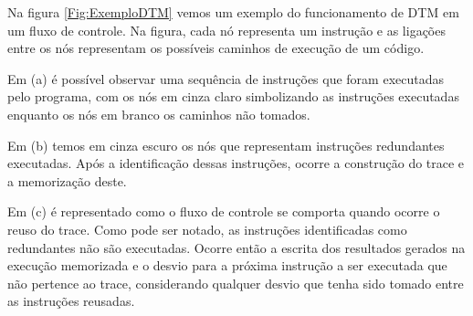 Na figura \ref{Fig:ExemploDTM} vemos um exemplo do funcionamento de DTM em um fluxo de controle. Na figura, cada nó representa um instrução e as ligações entre os nós representam os possíveis caminhos de execução de um código. 

Em (a) é possível observar uma sequência de instruções que foram executadas pelo programa, com os nós em cinza claro simbolizando as instruções executadas enquanto os nós em branco os caminhos não tomados.

Em (b) temos em cinza escuro os nós que representam instruções redundantes executadas. Após a identificação dessas instruções, ocorre a construção do trace e a memorização deste.

Em (c) é representado como o fluxo de controle se comporta quando ocorre o reuso do trace. Como pode ser notado, as instruções identificadas como redundantes não são executadas. Ocorre então a escrita dos resultados gerados na execução memorizada e o desvio para a próxima instrução a ser executada que não pertence ao trace, considerando qualquer desvio que tenha sido tomado entre as instruções reusadas.

